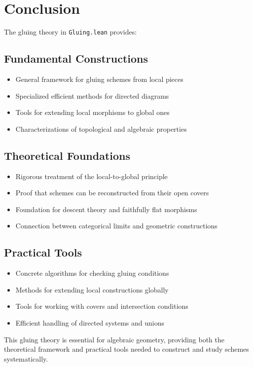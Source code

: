 \documentclass{article}
\theoremstyle{definition}
\begin{document}
\section{Conclusion}

The gluing theory in \texttt{Gluing.lean} provides:

\subsection{Fundamental Constructions}
\begin{itemize}
\item General framework for gluing schemes from local pieces
\item Specialized efficient methods for directed diagrams
\item Tools for extending local morphisms to global ones
\item Characterizations of topological and algebraic properties
\end{itemize}

\subsection{Theoretical Foundations}
\begin{itemize}
\item Rigorous treatment of the local-to-global principle
\item Proof that schemes can be reconstructed from their open covers
\item Foundation for descent theory and faithfully flat morphisms
\item Connection between categorical limits and geometric constructions
\end{itemize}

\subsection{Practical Tools}
\begin{itemize}
\item Concrete algorithms for checking gluing conditions
\item Methods for extending local constructions globally
\item Tools for working with covers and intersection conditions
\item Efficient handling of directed systems and unions
\end{itemize}

This gluing theory is essential for algebraic geometry, providing both the theoretical framework and practical tools needed to construct and study schemes systematically.
\end{document}
